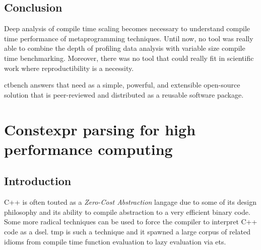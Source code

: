 \documentclass[english,12pt,a4paper]{book}
\providecommand{\cpp}{\textsc{C++}\xspace}
\begin{document}




% 

\section{
  Conclusion
}


Deep analysis of compile time scaling becomes necessary to understand
compile time performance of metaprogramming techniques.
Until now, no tool was really able to combine the depth of profiling data
analysis with variable size compile time benchmarking.
Moreover, there was no tool that could really fit in scientific work
where reproductibility is a necessity.

ctbench answers that need as a simple, powerful, and extensible
open-source solution that is peer-reviewed and distributed as a reusable
software package.

\chapter{
  Constexpr parsing for high performance computing
}

\section{Introduction}

\cpp is often touted as a \textit{Zero-Cost Abstraction} langage due to some of
its design philosophy and its ability to compile abstraction to a very efficient
binary code. Some more radical techniques can be used to force the compiler to
interpret \cpp code as a \gls{dsel}. \Gls{tmp} is such a technique
and it spawned a large corpus of related idioms from compile time function
evaluation to lazy evaluation via \glspl{et}.
\end{document}
